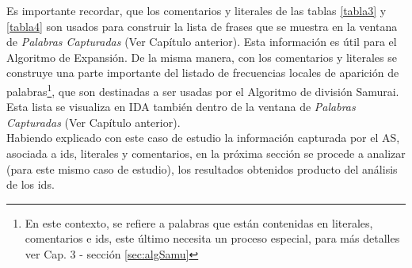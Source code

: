 Es importante recordar, que los comentarios y literales de las tablas \ref{tabla3} y \ref{tabla4} son usados para construir la lista de frases que se muestra en la ventana de \textit{Palabras Capturadas} (Ver Capítulo anterior). Esta información es útil para el Algoritmo de Expansión. De la misma manera, con los comentarios y literales se construye una parte importante del listado de frecuencias locales de aparición de palabras\footnote[2]{En este contexto, se refiere a palabras que están contenidas en literales, comentarios e ids, este último necesita un proceso especial, para más detalles ver Cap. 3 - sección \ref{sec:algSamu}}, que son destinadas a ser usadas por el Algoritmo de división Samurai. Esta lista se visualiza en IDA también dentro de la ventana de \textit{Palabras Capturadas} (Ver Capítulo anterior).\\

Habiendo explicado con este caso de estudio la información capturada por el AS, asociada a ids, literales y comentarios, en la próxima sección se procede a analizar (para este mismo caso de estudio), los resultados obtenidos producto del análisis de los ids. 

